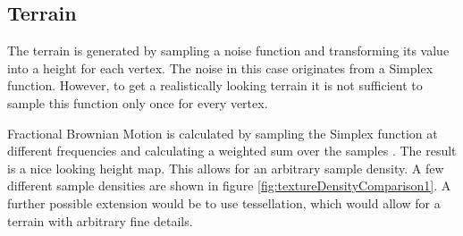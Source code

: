 \newpage
\subsection{Terrain}
The terrain is generated by sampling a noise function and transforming its value into a height for each vertex. The noise in this case originates from a Simplex function. However, to get a realistically looking terrain it is not sufficient to sample this function only once for every vertex.

Fractional Brownian Motion is calculated by sampling the Simplex function at different frequencies and calculating a weighted sum over the samples \cite{FracBrownMotion}. The result is a nice looking height map. This allows for an arbitrary sample density. A few different sample densities are shown in figure \ref{fig:textureDensityComparison1}. A further possible extension would be to use tessellation, which would allow for a terrain with arbitrary fine details.  

